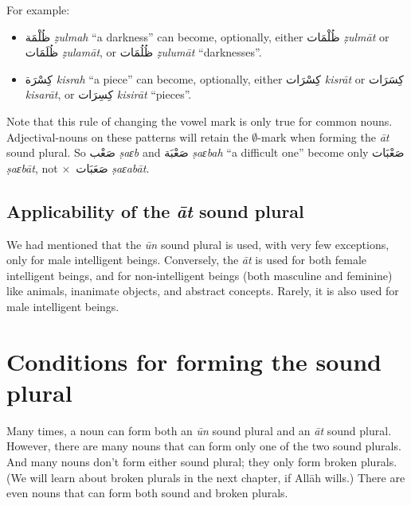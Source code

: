 \documentclass[
  10pt,
]{book}
\providecommand{\tightlist}{%
  \setlength{\itemsep}{0pt}\setlength{\parskip}{0pt}}
\begin{document}
\begin{enumerate}
  For example:

  \begin{itemize}
  \tightlist
  \item
    \foreignlanguage{arabic}{ظُلْمَة} \emph{ẓulmah} \enquote{a darkness} can become, optionally, either \foreignlanguage{arabic}{ظُلْمَات} \emph{ẓulmāt} or \foreignlanguage{arabic}{ظُلَمَات} \emph{ẓulamāt}, or \foreignlanguage{arabic}{ظُلُمَات} \emph{ẓulumāt} \enquote{darknesses}.
  \item
    \foreignlanguage{arabic}{کِسْرَة} \emph{kisrah} \enquote{a piece} can become, optionally, either \foreignlanguage{arabic}{کِسْرَات} \emph{kisrāt} or \foreignlanguage{arabic}{کِسَرَات} \emph{kisarāt}, or \foreignlanguage{arabic}{کِسِرَات} \emph{kisirāt} \enquote{pieces}.
  \end{itemize}
\end{enumerate}

Note that this rule of changing the vowel mark is only true for common nouns. Adjectival-nouns on these patterns will retain the \(\emptyset\)-mark when forming the \emph{āt} sound plural. So \foreignlanguage{arabic}{صَعْب} \emph{ṣaɛb} and \foreignlanguage{arabic}{صَعْبَة} \emph{ṣaɛbah} \enquote{a difficult one} become only \foreignlanguage{arabic}{صَعْبَات} \emph{ṣaɛbāt}, not \(\times\)~\foreignlanguage{arabic}{صَعَبَات} \emph{ṣaɛabāt}.

\subsection{\texorpdfstring{Applicability of the \emph{āt} sound plural}{Applicability of the āt sound plural}}\label{applicability-of-the-at-sound-plural}

We had mentioned that the \emph{ūn} sound plural is used, with very few exceptions, only for male intelligent beings. Conversely, the \emph{āt} is used for both female intelligent beings, and for non-intelligent beings (both masculine and feminine) like animals, inanimate objects, and abstract concepts. Rarely, it is also used for male intelligent beings.

\section{Conditions for forming the sound plural}\label{conditions-for-forming-the-sound-plural}

Many times, a noun can form both an \emph{ūn} sound plural and an \emph{āt} sound plural.
However, there are many nouns that can form only one of the two sound plurals.
And many nouns don't form either sound plural; they only form broken plurals. (We will learn about broken plurals in the next chapter, if Allāh wills.) There are even nouns that can form both sound and broken plurals.
\end{document}
